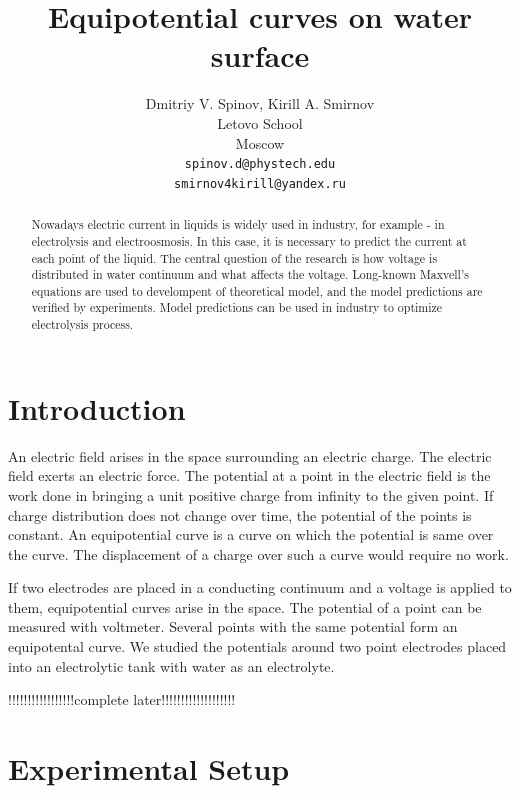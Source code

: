 \documentclass{article}
\title{Equipotential curves on water surface}
\author{
  Dmitriy V. Spinov, Kirill A. Smirnov \\
  Letovo School \\
  Moscow\\
  \texttt{spinov.d@phystech.edu} \\
  \texttt{smirnov4kirill@yandex.ru} \\
}
\begin{document}
\maketitle


\begin{abstract}
Nowadays electric current in liquids is widely used in industry, for example - in electrolysis and electroosmosis. In this case, it is necessary to predict the current at each point of the liquid. The central question of the research is how voltage is distributed in water continuum and what affects the voltage. Long-known Maxvell's equations are used to develompent of theoretical model, and the model predictions are verified by experiments. Model predictions can be used in industry to optimize electrolysis process.
\end{abstract}


\section{Introduction}            %
An electric field arises in the space surrounding an electric charge. The electric field exerts an electric force. The potential at a point in the electric field is the work done in bringing a unit positive charge from infinity to the given point. If charge distribution does not change over time, the potential of the points is constant. An equipotential curve is a curve on which the potential is same over the curve. The displacement of a charge over such a curve would require no work.\par

If two electrodes are placed in a conducting continuum and a voltage is applied to them, equipotential curves arise in the space. The potential of a point can be measured with voltmeter. Several points with the same potential form an equipotental curve. We studied the potentials around two point electrodes placed into an electrolytic tank with water as an electrolyte.

!!!!!!!!!!!!!!!!!complete later!!!!!!!!!!!!!!!!!!!
\cite{qqqqq}


\section{Experimental Setup}
\end{document}

